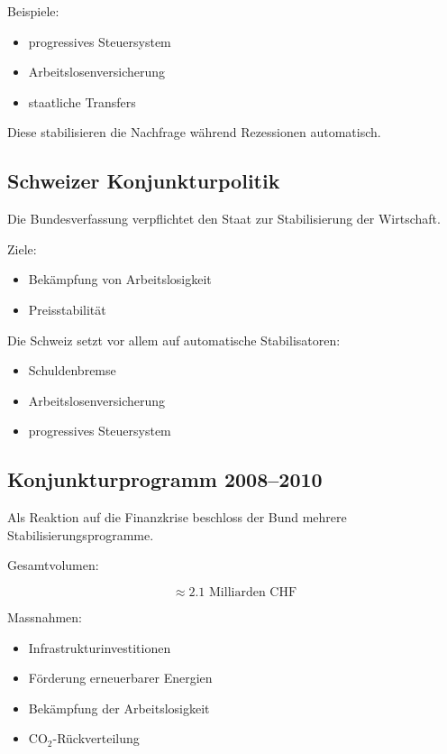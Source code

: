Beispiele:

\begin{itemize}
\item progressives Steuersystem
\item Arbeitslosenversicherung
\item staatliche Transfers
\end{itemize}

Diese stabilisieren die Nachfrage während Rezessionen automatisch.


\subsection{Schweizer Konjunkturpolitik}

Die Bundesverfassung verpflichtet den Staat zur Stabilisierung der Wirtschaft.

Ziele:

\begin{itemize}
\item Bekämpfung von Arbeitslosigkeit
\item Preisstabilität
\end{itemize}

Die Schweiz setzt vor allem auf automatische Stabilisatoren:

\begin{itemize}
\item Schuldenbremse
\item Arbeitslosenversicherung
\item progressives Steuersystem
\end{itemize}


\subsection{Konjunkturprogramm 2008--2010}

Als Reaktion auf die Finanzkrise beschloss der Bund mehrere 
Stabilisierungsprogramme.

Gesamtvolumen:

\[
\approx 2.1 \text{ Milliarden CHF}
\]

Massnahmen:

\begin{itemize}
\item Infrastrukturinvestitionen
\item Förderung erneuerbarer Energien
\item Bekämpfung der Arbeitslosigkeit
\item CO$_2$-Rückverteilung
\end{itemize}

